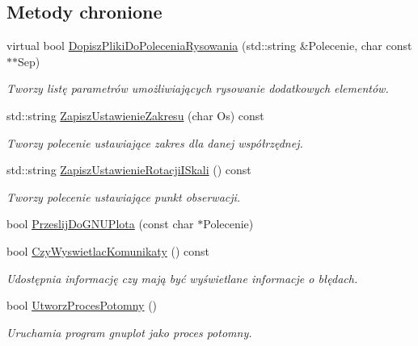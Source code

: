 \subsection*{Metody chronione}
\begin{DoxyCompactItemize}
\item 
virtual bool \mbox{\hyperlink{class_pz_g_1_1_lacze_do_g_n_u_plota_a25585ec3f1bd3b6bf42f374c38b8d237}{Dopisz\+Pliki\+Do\+Polecenia\+Rysowania}} (std\+::string \&Polecenie, char const $\ast$$\ast$Sep)
\begin{DoxyCompactList}\small\item\em Tworzy listę parametrów umożliwiających rysowanie dodatkowych elementów. \end{DoxyCompactList}\item 
std\+::string \mbox{\hyperlink{class_pz_g_1_1_lacze_do_g_n_u_plota_a4579aecf7b4777fdde0cae4e98c275c2}{Zapisz\+Ustawienie\+Zakresu}} (char Os) const
\begin{DoxyCompactList}\small\item\em Tworzy polecenie ustawiające zakres dla danej współrzędnej. \end{DoxyCompactList}\item 
std\+::string \mbox{\hyperlink{class_pz_g_1_1_lacze_do_g_n_u_plota_aa92b463e8cbae31b50dd797a4183bce8}{Zapisz\+Ustawienie\+Rotacji\+I\+Skali}} () const
\begin{DoxyCompactList}\small\item\em Tworzy polecenie ustawiające punkt obserwacji. \end{DoxyCompactList}\item 
bool \mbox{\hyperlink{class_pz_g_1_1_lacze_do_g_n_u_plota_a5063854b7232a7951d120a21df63f2b7}{Przeslij\+Do\+G\+N\+U\+Plota}} (const char $\ast$Polecenie)
\item 
bool \mbox{\hyperlink{class_pz_g_1_1_lacze_do_g_n_u_plota_a5e4f3a226ed36f7110032d802d84847c}{Czy\+Wyswietlac\+Komunikaty}} () const
\begin{DoxyCompactList}\small\item\em Udostępnia informację czy mają być wyświetlane informacje o błędach. \end{DoxyCompactList}\item 
bool \mbox{\hyperlink{class_pz_g_1_1_lacze_do_g_n_u_plota_a1c7b9acc40de8d8bbb40fb0722512933}{Utworz\+Proces\+Potomny}} ()
\begin{DoxyCompactList}\small\item\em Uruchamia program {\itshape gnuplot} jako proces potomny. \end{DoxyCompactList}\item 
$$
\end{DoxyCompactItemize}
